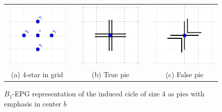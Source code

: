 \begin{figure}[htb]
  \centering
  \begin{tabular}{c c c c c }
    \includegraphics[width=4cm]{./img/tortaGrade.png}    
    & &\includegraphics[width=4cm]{./img/truePieGrid.png} 
    & &
 \includegraphics[width=4cm]{./img/falsePieGrid.png} \\%
    {\footnotesize (a) 4-star in grid}  & &  {\footnotesize (b) True pie} & & {\footnotesize (c) False pie} %
  \end{tabular}
  \caption{$B_{1}$-EPG representation of the induced cicle of size 4 as pies with emphasis in center $b$}\label{fig:piesInGrid}
\end{figure} 